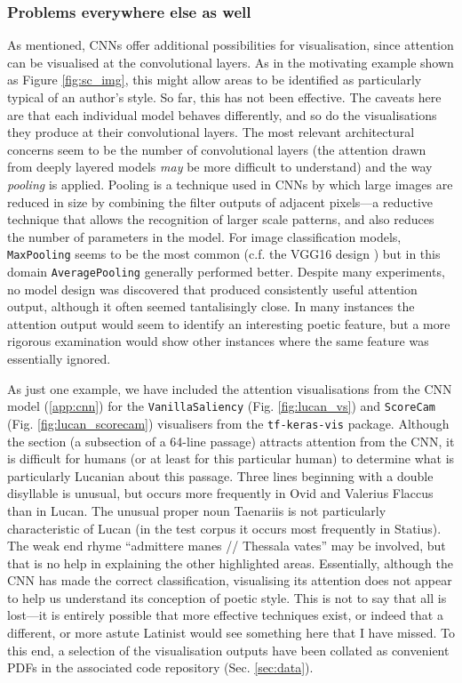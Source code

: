\documentclass[
    twocolumn,
    hf,
]{ceurart}
\begin{document}
\subsubsection{Problems everywhere else as well}

As mentioned, CNNs offer additional possibilities for visualisation, since
attention can be visualised at the convolutional layers. As in the motivating
example shown as Figure \ref{fig:sc_img}, this might allow areas to be identified
as particularly typical of an author's style. So far, this has not been
effective. The caveats here are that each individual model behaves differently,
and so do the visualisations they produce at their convolutional layers. The
most relevant architectural concerns seem to be the number of convolutional
layers (the attention drawn from deeply layered models \emph{may} be more
difficult to understand) and the way \emph{pooling} is applied. Pooling is a
technique used in CNNs by which large images are reduced in size by combining
the filter outputs of adjacent pixels---a reductive technique that allows the
recognition of larger scale patterns, and also reduces the number of parameters
in the model. For image classification models, \texttt{MaxPooling}
seems to be the most common (c.f. the VGG16 design \cite{vgg16}) but in this
domain \texttt{AveragePooling} generally performed better. Despite
many experiments, no model design was discovered that produced consistently
useful attention output, although it often seemed tantalisingly close. In many
instances the attention output would seem to identify an interesting poetic
feature, but a more rigorous examination would show other instances where the
same feature was essentially ignored.



As just one example, we have included the attention visualisations from the CNN
model (\ref{app:cnn}) for the \texttt{VanillaSaliency} (Fig.
\ref{fig:lucan_vs}) and \texttt{ScoreCam} (Fig.
\ref{fig:lucan_scorecam}) visualisers from the \texttt{tf-keras-vis}
package. Although the section (a subsection of a 64-line passage) attracts
attention from the CNN, it is difficult for humans (or at least for this
particular human) to determine what is particularly Lucanian about this
passage. Three lines beginning with a double disyllable is unusual, but occurs
more frequently in Ovid and Valerius Flaccus than in Lucan. The unusual proper
noun Taenariis is not particularly characteristic of Lucan (in the test corpus
it occurs most frequently in Statius). The weak end rhyme ``admittere manes //
Thessala vates'' may be involved, but that is no help in explaining the other
highlighted areas. Essentially, although the CNN has made the correct
classification, visualising its attention does not appear to help us understand
its conception of poetic style. This is not to say that all is lost---it is
entirely possible that more effective techniques exist, or indeed that a
different, or more astute Latinist would see something here that I have missed.
To this end, a selection of the visualisation outputs have been collated as
convenient PDFs in the associated code repository (Sec. \ref{sec:data}).
\end{document}
